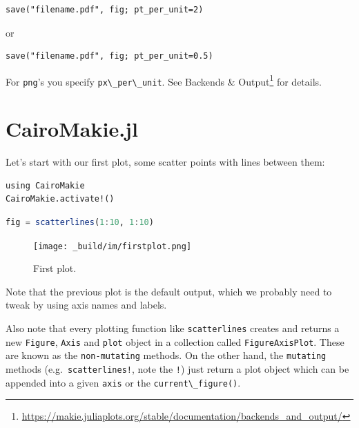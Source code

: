 \documentclass[
  notoc %
]{tufte-book}
\DeclareRobustCommand{\href}[2]{#2\footnote{\url{#1}}}
\newcommand{\passthrough}[1]{#1}
\begin{document}
\begin{lstlisting}
save("filename.pdf", fig; pt_per_unit=2)
\end{lstlisting}

or

\begin{lstlisting}
save("filename.pdf", fig; pt_per_unit=0.5)
\end{lstlisting}

For \passthrough{\lstinline!png!}'s you specify
\passthrough{\lstinline!px\_per\_unit!}. See
\href{https://makie.juliaplots.org/stable/documentation/backends_and_output/}{Backends
\& Output} for details.

\hypertarget{sec:cairomakie}{%
\section{CairoMakie.jl}\label{sec:cairomakie}}

Let's start with our first plot, some scatter points with lines between
them:

\begin{lstlisting}
using CairoMakie
CairoMakie.activate!()
\end{lstlisting}

\begin{lstlisting}[language=Julia]
fig = scatterlines(1:10, 1:10)
\end{lstlisting}

\begin{figure}
\hypertarget{fig:firstplot}{%
\centering
\texttt{[image: \_build/im/firstplot.png]}
\caption{First plot.}\label{fig:firstplot}
}
\end{figure}

Note that the previous plot is the default output, which we probably
need to tweak by using axis names and labels.

Also note that every plotting function like
\passthrough{\lstinline!scatterlines!} creates and returns a new
\passthrough{\lstinline!Figure!}, \passthrough{\lstinline!Axis!} and
\passthrough{\lstinline!plot!} object in a collection called
\passthrough{\lstinline!FigureAxisPlot!}. These are known as the
\passthrough{\lstinline!non-mutating!} methods. On the other hand, the
\passthrough{\lstinline!mutating!} methods
(e.g.~\passthrough{\lstinline"scatterlines!"}, note the
\passthrough{\lstinline"!"}) just return a plot object which can be
appended into a given \passthrough{\lstinline!axis!} or the
\passthrough{\lstinline!current\_figure()!}.
\end{document}
